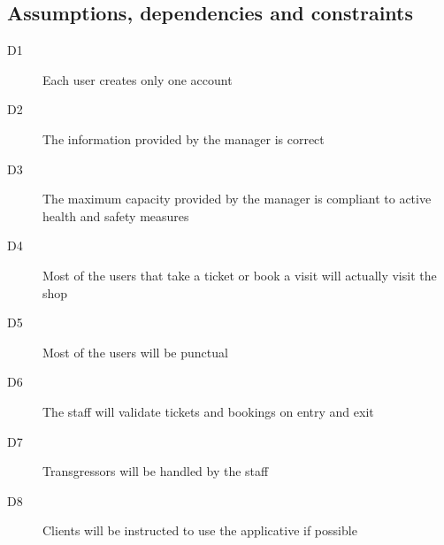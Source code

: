 \subsection{Assumptions, dependencies and constraints}
\begin{description}
    \item[D1] Each user creates only one account
    \item[D2] The information provided by the manager is correct
    \item[D3] The maximum capacity provided by the manager is compliant to active health and safety measures 
    \item[D4] Most of the users that take a ticket or book a visit will actually visit the shop
    \item[D5] Most of the users will be punctual
    \item[D6] The staff will validate tickets and bookings on entry and exit
    \item[D7] Transgressors will be handled by the staff
    \item[D8] Clients will be instructed to use the applicative if possible
\end{description}